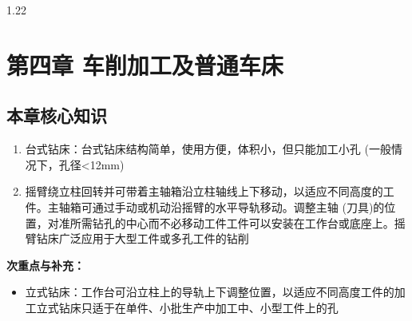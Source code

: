 \documentclass[12pt,a4paper]{article}
\begin{document}
\begin{spacing}{1.22}
\section{第四章 车削加工及普通车床}
\subsection{本章核心知识}
\begin{tcolorbox}[colback=yellow!6,colframe=red!55!black,title=重点,left=1mm,right=1mm]
\begin{enumerate}[leftmargin=2.2em,label=\arabic*.]
  \item 台式钻床：台式钻床结构简单，使用方便，体积小，但只能加工小孔 (一般情况下，孔径<12mm)
  \item 摇臂绕立柱回转并可带着主轴箱沿立柱轴线上下移动，以适应不同高度的工件。主轴箱可通过手动或机动沿摇臂的水平导轨移动。调整主轴 (刀具)的位置，对准所需钻孔的中心而不必移动工件工件可以安装在工作台或底座上。摇臂钻床广泛应用于大型工件或多孔工件的钻削
\end{enumerate}
\end{tcolorbox}
\noindent\textbf{次重点与补充：}
\begin{itemize}[leftmargin=2.2em,label=--]
  \item 立式钻床：工作台可沿立柱上的导轨上下调整位置，以适应不同高度工件的加工立式钻床只适于在单件、小批生产中加工中、小型工件上的孔
\end{itemize}


\end{spacing}
\end{document}
